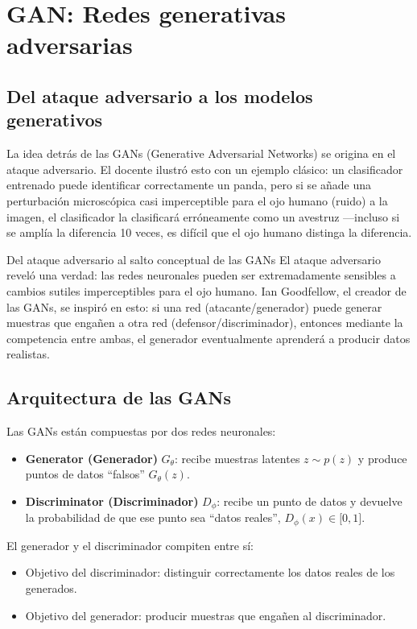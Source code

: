 \documentclass[a4paper]{article}
\begin{document}
\newpage
\section{GAN: Redes generativas adversarias}

\subsection{Del ataque adversario a los modelos generativos}

La idea detrás de las GANs (Generative Adversarial Networks) se origina en el ataque adversario. El docente ilustró esto con un ejemplo clásico: un clasificador entrenado puede identificar correctamente un panda, pero si se añade una perturbación microscópica casi imperceptible para el ojo humano (ruido) a la imagen, el clasificador la clasificará erróneamente como un avestruz —incluso si se amplía la diferencia 10 veces, es difícil que el ojo humano distinga la diferencia.

\begin{knowledgebox}{Del ataque adversario al salto conceptual de las GANs}
El ataque adversario reveló una verdad: las redes neuronales pueden ser extremadamente sensibles a cambios sutiles imperceptibles para el ojo humano. Ian Goodfellow, el creador de las GANs, se inspiró en esto: si una red (atacante/generador) puede generar muestras que engañen a otra red (defensor/discriminador), entonces mediante la competencia entre ambas, el generador eventualmente aprenderá a producir datos realistas.
\end{knowledgebox}

\subsection{Arquitectura de las GANs}

Las GANs están compuestas por dos redes neuronales:

\begin{itemize}
    \item \textbf{Generator (Generador)} $G_\theta$: recibe muestras latentes $z \sim p(z)$ y produce puntos de datos ``falsos'' $G_\theta(z)$.
    \item \textbf{Discriminator (Discriminador)} $D_\phi$: recibe un punto de datos y devuelve la probabilidad de que ese punto sea ``datos reales'', $D_\phi(x) \in {[}0, 1{]}$.
\end{itemize}

El generador y el discriminador compiten entre sí:
\begin{itemize}
    \item Objetivo del discriminador: distinguir correctamente los datos reales de los generados.
    \item Objetivo del generador: producir muestras que engañen al discriminador.
\end{itemize}
\end{document}
